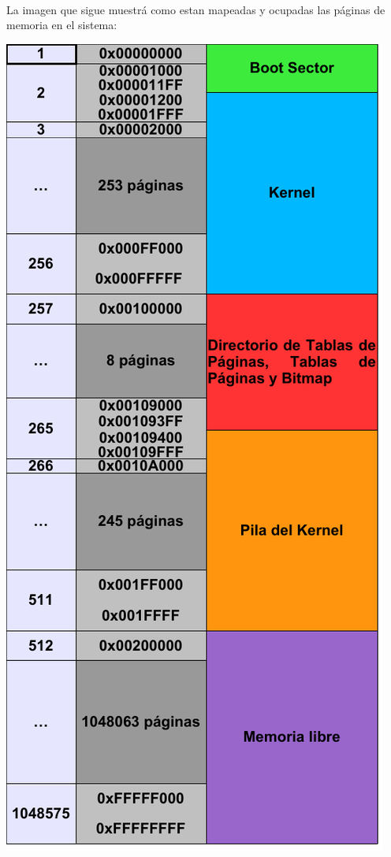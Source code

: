 \documentclass[11pt, a4paper]{article}
\begin{document}
	\paragraph{}
	La imagen que sigue muestrá como estan mapeadas y ocupadas las páginas de memoria en el sistema:
	\begin{center}
		\includegraphics[scale=0.80]{./otros/mapa_memoria.pdf}
	\end{center}
	
\end{document}
